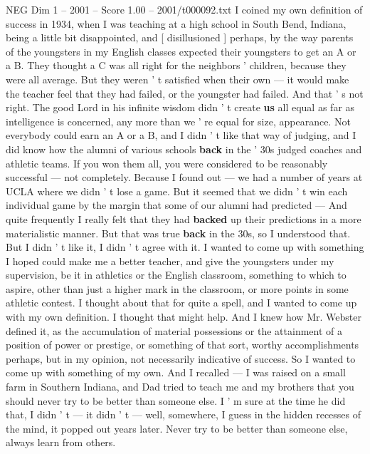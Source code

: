 \begin{textsample}{NEG Dim 1 – 2001 – Score 1.00 – 2001/t000092.txt}  \label{ex:f1_neg_005}
I coined my own definition of success in 1934, when I was teaching at a high school in South Bend, Indiana, being a little bit disappointed, and [ disillusioned ] perhaps, by the way parents of the youngsters in my English classes expected their youngsters to get an A or a B.
They thought a C was all right for the neighbors ' children, because they were all average.
But they weren ' t satisfied when their own — it would make the teacher feel that they had failed, or the youngster had failed.
And that ' s not right.
The good Lord in his infinite wisdom didn ' t create \textbf{us} all equal as far as intelligence is concerned, any more than we ' re equal for size, appearance.
Not everybody could earn an A or a B, and I didn ' t like that way of judging, and I did know how the alumni of various schools \textbf{back} in the ' 30s judged coaches and athletic teams.
If you won them all, you were considered to be reasonably successful — not completely.
Because I found out — we had a number of years at UCLA where we didn ' t lose a game.
But it seemed that we didn ' t win each individual game by the margin that some of our alumni had predicted — And quite frequently I really felt that they had \textbf{backed} up their predictions in a more materialistic manner.
But that was true \textbf{back} in the 30s, so I understood that.
But I didn ' t like it, I didn ' t agree with it.
I wanted to come up with something I hoped could make me a better teacher, and give the youngsters under my supervision, be it in athletics or the English classroom, something to which to aspire, other than just a higher mark in the classroom, or more points in some athletic contest.
I thought about that for quite a spell, and I wanted to come up with my own definition.
I thought that might help.
And I knew how Mr.
Webster defined it, as the accumulation of material possessions or the attainment of a position of power or prestige, or something of that sort, worthy accomplishments perhaps, but in my opinion, not necessarily indicative of success.
So I wanted to come up with something of my own.
And I recalled — I was raised on a small farm in Southern Indiana, and Dad tried to teach me and my brothers that you should never try to be better than someone else.
I ' m sure at the time he did that, I didn ' t — it didn ' t — well, somewhere, I guess in the hidden recesses of the mind, it popped out years later.
Never try to be better than someone else, always learn from others.

\end{textsample}
